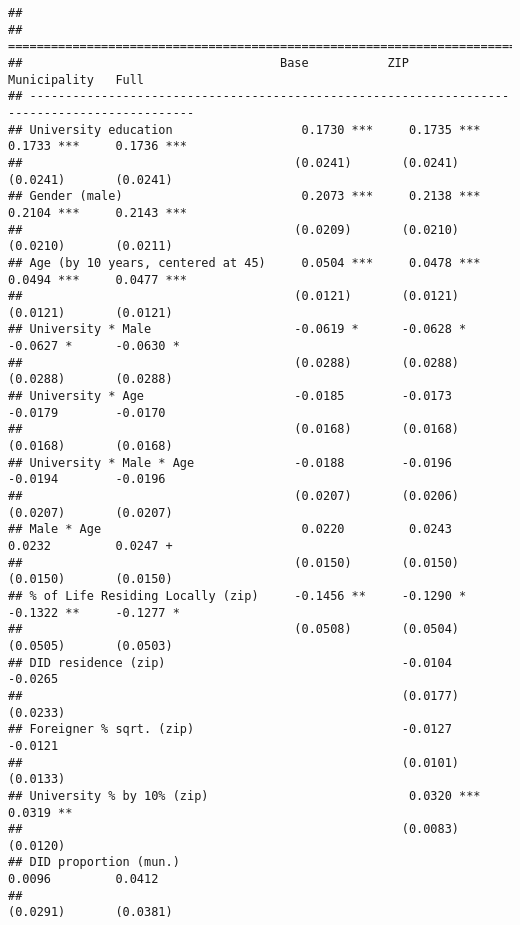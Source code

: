 \documentclass[
]{article}
\begin{document}
\begin{verbatim}
## 
## =============================================================================================
##                                    Base           ZIP            Municipality   Full         
## ---------------------------------------------------------------------------------------------
## University education                  0.1730 ***     0.1735 ***     0.1733 ***     0.1736 ***
##                                      (0.0241)       (0.0241)       (0.0241)       (0.0241)   
## Gender (male)                         0.2073 ***     0.2138 ***     0.2104 ***     0.2143 ***
##                                      (0.0209)       (0.0210)       (0.0210)       (0.0211)   
## Age (by 10 years, centered at 45)     0.0504 ***     0.0478 ***     0.0494 ***     0.0477 ***
##                                      (0.0121)       (0.0121)       (0.0121)       (0.0121)   
## University * Male                    -0.0619 *      -0.0628 *      -0.0627 *      -0.0630 *  
##                                      (0.0288)       (0.0288)       (0.0288)       (0.0288)   
## University * Age                     -0.0185        -0.0173        -0.0179        -0.0170    
##                                      (0.0168)       (0.0168)       (0.0168)       (0.0168)   
## University * Male * Age              -0.0188        -0.0196        -0.0194        -0.0196    
##                                      (0.0207)       (0.0206)       (0.0207)       (0.0207)   
## Male * Age                            0.0220         0.0243         0.0232         0.0247 +  
##                                      (0.0150)       (0.0150)       (0.0150)       (0.0150)   
## % of Life Residing Locally (zip)     -0.1456 **     -0.1290 *      -0.1322 **     -0.1277 *  
##                                      (0.0508)       (0.0504)       (0.0505)       (0.0503)   
## DID residence (zip)                                 -0.0104                       -0.0265    
##                                                     (0.0177)                      (0.0233)   
## Foreigner % sqrt. (zip)                             -0.0127                       -0.0121    
##                                                     (0.0101)                      (0.0133)   
## University % by 10% (zip)                            0.0320 ***                    0.0319 ** 
##                                                     (0.0083)                      (0.0120)   
## DID proportion (mun.)                                               0.0096         0.0412    
##                                                                    (0.0291)       (0.0381)   

\end{verbatim}
\end{document}
